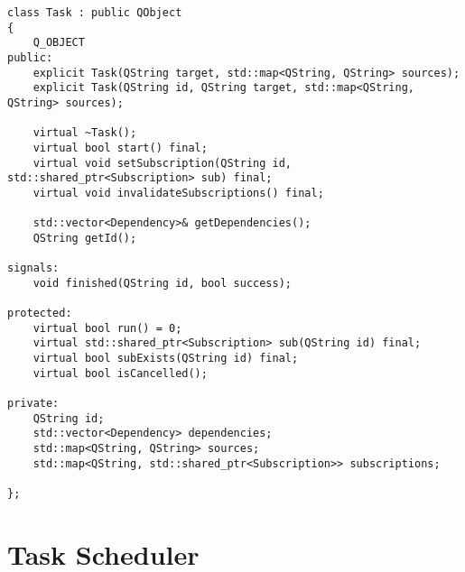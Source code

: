 \begin{minipage}{\textwidth}
	\begin{lstlisting}[label=task:interface, caption={Interfejs klasy \lstinline$Task$},alsoletter={()[].=}]
class Task : public QObject
{
	Q_OBJECT
public:
	explicit Task(QString target, std::map<QString, QString> sources);
	explicit Task(QString id, QString target, std::map<QString, QString> sources);

	virtual ~Task();
	virtual bool start() final;
	virtual void setSubscription(QString id, std::shared_ptr<Subscription> sub) final;
	virtual void invalidateSubscriptions() final;

	std::vector<Dependency>& getDependencies();
	QString getId();

signals:
	void finished(QString id, bool success);

protected:
	virtual bool run() = 0;
	virtual std::shared_ptr<Subscription> sub(QString id) final;
	virtual bool subExists(QString id) final;
	virtual bool isCancelled();

private:
	QString id;
	std::vector<Dependency> dependencies;
	std::map<QString, QString> sources;
	std::map<QString, std::shared_ptr<Subscription>> subscriptions;

};
	\end{lstlisting}
\end{minipage}


\section{Task Scheduler} 